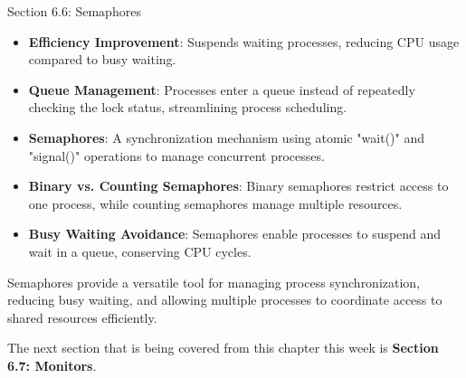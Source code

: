 \begin{notes}{Section 6.6: Semaphores}
    \begin{highlight}
    
        \begin{itemize}
            \item \textbf{Efficiency Improvement}: Suspends waiting processes, reducing CPU usage compared to busy waiting.
            \item \textbf{Queue Management}: Processes enter a queue instead of repeatedly checking the lock status, streamlining process scheduling.
        \end{itemize}
    
    \end{highlight}
    
    \begin{highlight}
    
        \begin{itemize}
            \item \textbf{Semaphores}: A synchronization mechanism using atomic "wait()" and "signal()" operations to manage concurrent processes.
            \item \textbf{Binary vs. Counting Semaphores}: Binary semaphores restrict access to one process, while counting semaphores manage multiple resources.
            \item \textbf{Busy Waiting Avoidance}: Semaphores enable processes to suspend and wait in a queue, conserving CPU cycles.
        \end{itemize}
    
    Semaphores provide a versatile tool for managing process synchronization, reducing busy waiting, and allowing multiple processes to coordinate access to shared resources efficiently.
    
    \end{highlight}
\end{notes}

The next section that is being covered from this chapter this week is \textbf{Section 6.7: Monitors}.

